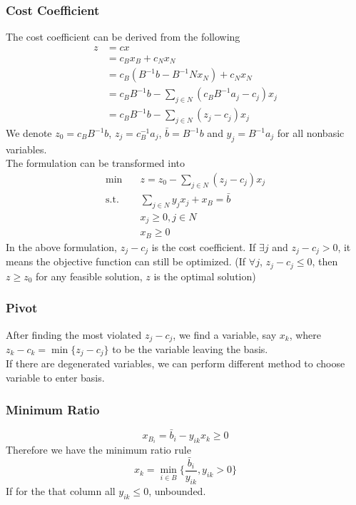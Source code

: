 					\subsubsection{Cost Coefficient}
						The cost coefficient can be derived from the following
						\begin{align}
							z &= cx \\
							  &= c_Bx_B + c_Nx_N \\
							  &= c_B(B^{-1}b - B^{-1}Nx_N) + c_Nx_N\\
							  &= c_BB^{-1}b - \sum_{j\in N}(c_BB^{-1}a_j - c_j)x_j \\
							  &= c_BB^{-1}b - \sum_{j\in N}(z_j-c_j)x_j 
	 					\end{align}
	 					We denote $z_0 = c_BB^{-1}b$, $z_j = c_B^{-1}a_j$, $\bar{b} = B^{-1}b$ and $y_j = B^{-1}a_j$ for all nonbasic variables.\\
	 					The formulation can be transformed into
	 					\begin{align}
	 						\min \quad & z = z_0 - \sum_{j\in N}(z_j - c_j)x_j\\
	 						\text{s.t.} \quad & \sum_{j\in N}y_jx_j + x_B = \bar{b} \\
	 										  & x_j \ge 0, j\in N \\
	 										  & x_B \ge 0 
	 					\end{align}
	 					In the above formulation, $z_j - c_j$ is the cost coefficient. If $\exists j$ and $z_j - c_j > 0$, it means the objective function can still be optimized. (If $\forall j$, $z_j - c_j \le 0$, then $z \ge z_0$ for any feasible solution, $z$ is the optimal solution)

	 				\subsubsection{Pivot}
	 					After finding the most violated $z_j - c_j$, we find a variable, say $x_k$, where $z_k - c_k = \min \{z_j - c_j\}$ to be the variable leaving the basis. \\
	 					If there are degenerated variables, we can perform different method to choose variable to enter basis.

	 				\subsubsection{Minimum Ratio}
	 					\begin{equation}
	 						x_{B_i} = \bar{b}_i - y_{ik}x_k \ge 0 
	 					\end{equation}
	 					Therefore we have the minimum ratio rule
	 					\begin{equation}
	 						x_k = \min_{i \in B} \{\frac{\bar{b}_i}{y_{ik}}, y_{ik} > 0\} 
	 					\end{equation}
	 					If for the that column all $y_{ik} \le 0$, unbounded.

